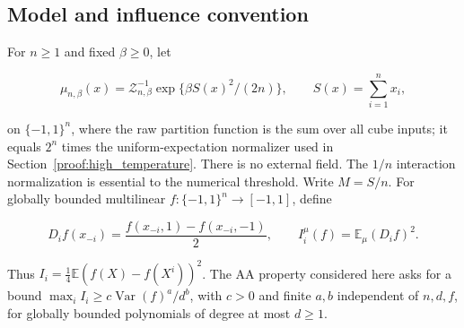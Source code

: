 \subsection{Model and influence convention}\label{cw:model-and-influence-convention}

For \(n\ge1\) and fixed \(\beta\ge0\), let

\[
\mu_{n,\beta}(x)=\mathcal Z_{n,\beta}^{-1}\exp\{\beta S(x)^2/(2n)\},\qquad S(x)=\sum_{i=1}^n x_i,
\]

on \(\{-1,1\}^n\), where the raw partition function is the sum over all cube inputs; it equals \(2^n\) times the uniform-expectation normalizer used in Section~\ref{proof:high_temperature}. There is no external field. The $1/n$ interaction normalization is essential to the numerical threshold. Write \(M=S/n\). For globally bounded multilinear \(f:\{-1,1\}^n\to[-1,1]\), define

\[
D_i f(x_{-i})=\frac{f(x_{-i},1)-f(x_{-i},-1)}2,\qquad
I_i^\mu(f)=\mathbb E_\mu(D_if)^2.
\]

Thus \(I_i=\tfrac14\mathbb E(f(X)-f(X^i))^2\). The AA property considered here asks for a bound \(\max_i I_i\ge c\operatorname{Var}(f)^a/d^b\), with \(c>0\) and finite $a,b$ independent of $n,d,f$, for globally bounded polynomials of degree at most \(d\ge1\).
